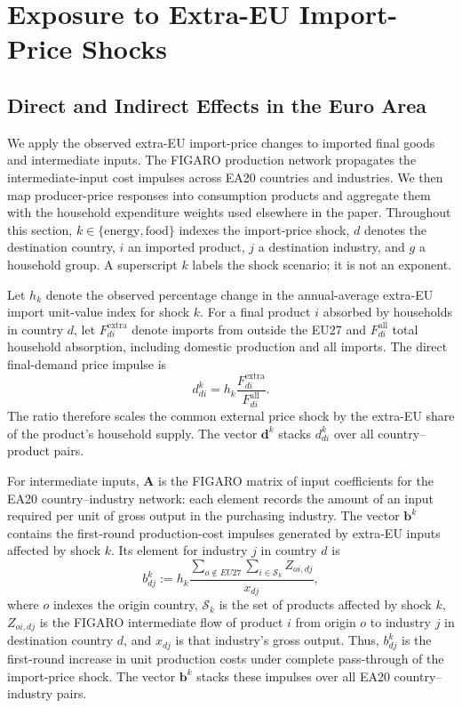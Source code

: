 \section{Exposure to Extra-EU Import-Price Shocks}
\label{sec:app-import-shock-exposure}

\subsection{Direct and Indirect Effects in the Euro Area}

We apply the observed extra-EU import-price changes to imported final goods and intermediate inputs.
The FIGARO production network propagates the intermediate-input cost impulses across EA20 countries
and industries. We then map producer-price responses into consumption products and aggregate them
with the household expenditure weights used elsewhere in the paper. Throughout this section,
$k\in\{\text{energy},\text{food}\}$ indexes the import-price shock, $d$ denotes the destination
country, $i$ an imported product, $j$ a destination industry, and $g$ a household group. A
superscript $k$ labels the shock scenario; it is not an exponent.

Let $h_k$ denote the observed percentage change in the annual-average extra-EU import unit-value
index for shock $k$. For a final product $i$ absorbed by households in country $d$, let
$F_{di}^{\mathrm{extra}}$ denote imports from outside the EU27 and
$F_{di}^{\mathrm{all}}$ total household absorption, including domestic production and all imports.
The direct final-demand price impulse is
\begin{equation}
d_{di}^{k}=h_k\frac{F_{di}^{\mathrm{extra}}}{F_{di}^{\mathrm{all}}}.
\label{eq:direct-import-price-impulse}
\end{equation}
The ratio therefore scales the common external price shock by the extra-EU share of the product's
household supply. The vector $\mathbf d^k$ stacks $d_{di}^{k}$ over all country--product pairs.

For intermediate inputs, $\mathbf A$ is the FIGARO matrix of input coefficients for the EA20
country--industry network: each element records the amount of an input required per unit of gross
output in the purchasing industry. The vector $\mathbf b^k$ contains the first-round production-cost
impulses generated by extra-EU inputs affected by shock $k$. Its element for industry $j$ in country
$d$ is
\begin{equation}
b_{dj}^{k}
:=h_k\frac{\sum_{o\notin EU27}\sum_{i\in\mathcal S_k}Z_{oi,dj}}{x_{dj}},
\label{eq:main-import-cost-impulse}
\end{equation}
where $o$ indexes the origin country, $\mathcal S_k$ is the set of products affected by shock $k$,
$Z_{oi,dj}$ is the FIGARO intermediate flow of product $i$ from origin $o$ to industry $j$ in
destination country $d$, and $x_{dj}$ is that industry's gross output. Thus, $b_{dj}^{k}$ is the
first-round increase in unit production costs under complete pass-through of the import-price shock.
The vector $\mathbf b^k$ stacks these impulses over all EA20 country--industry pairs.


